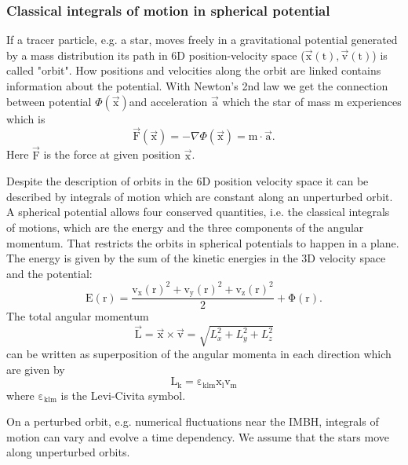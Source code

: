 \subsubsection{Classical integrals of motion in spherical potential}\label{sec:iof}
If a tracer particle, e.g. a star, moves freely in a gravitational potential generated by a mass distribution its path in 6D position-velocity space (\(\vec{\mathrm{x}}(\mathrm{t}),\vec{\mathrm{v}}(\mathrm{t})\)) is called "orbit".
How positions and velocities along the orbit are linked contains information about the potential. With Newton's 2nd law we get the connection between potential \(\Phi(\vec{\mathrm{x}})\)and acceleration \(\vec{\mathrm{a}}\) which the star of mass m experiences which is 
\begin{equation}\label{eq:Newton}
\vec{\mathrm{F}}(\vec{\mathrm{x}})=-\nabla\Phi(\vec{\mathrm{x}})=\mathrm{m}\cdot\vec{\mathrm{a}}.  
\end{equation}
Here \(\vec{\mathrm{F}}\) is the force at given position \(\vec{\mathrm{x}}\).
\par Despite the description of orbits in the 6D position velocity space it can be described by integrals of motion which are constant along an unperturbed orbit. A spherical potential allows four conserved quantities, i.e. the classical integrals of motions, which are the energy and the three components of the angular momentum. That restricts the orbits in spherical potentials to happen in a plane. The energy is given by the sum of the kinetic energies in the 3D velocity space and the potential:
\begin{equation}\label{eq:energy}
\mathrm{E(r)=\frac{v_x(r)^2+v_y(r)^2+v_z(r)^2}{2}+\Phi(r)}.
\end{equation}
The total angular momentum
\begin{equation}\label{eq:total_ang_mom}
\vec{\mathrm{L}}=\vec{\mathrm{x}}\times\vec{\mathrm{v}}=\sqrt{L_x^2+L_y^2+L_z^2}
\end{equation}
can be written as superposition of the angular momenta in each direction which are given by 
\begin{equation}\label{eq:ang_mom}
\mathrm{L_k=\varepsilon_{klm}x_l v_m}
\end{equation}
where \(\mathrm{\varepsilon_{klm}}\) is the Levi-Civita symbol.  
\par On a perturbed orbit, e.g. numerical fluctuations near the \ac{IMBH}, integrals of motion can vary and evolve a time dependency. We assume that the stars move along unperturbed orbits. 

